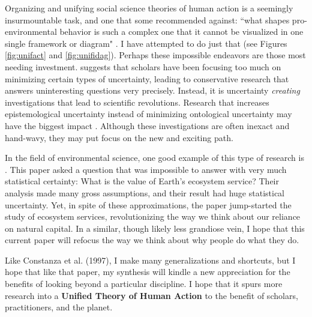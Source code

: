 \documentclass[12 pt]{article}
\begin{document}
 
Organizing and unifying social science theories of human action is a seemingly insurmountable task, and one that some recommended against: ``what shapes pro-environmental behavior is such a complex one that it cannot be visualized in one single framework or diagram" \parencite[][p. 248]{Kollmuss2002}. I have attempted to do just that (see Figures \ref{fig:unifact} and \ref{fig:unifidag}). 
Perhaps these impossible endeavors are those most needing investment. \textcite{Haslam2001} suggests that scholars have been focusing too much on minimizing certain types of uncertainty, leading to conservative research that answers uninteresting questions very precisely. Instead, it is uncertainty \textit{creating} investigations that lead to scientific revolutions. Research that increases epistemological uncertainty instead of minimizing ontological uncertainty may have the biggest impact \parencite{Haslam2001}. Although these investigations are often inexact and hand-wavy, they may put focus on the new and exciting path. 

In the field of environmental science, one good example of this type of research is \textcite{Costanza1997}. This paper asked a question that was impossible to answer with very much statistical certainty: What is the value of Earth's ecosystem service? Their analysis made many gross assumptions, and their result had huge statistical uncertainty. Yet, in spite of these approximations, the paper jump-started the study of ecosystem services, revolutionizing the way we think about our reliance on natural capital.  In a similar, though likely less grandiose vein, I hope that this current paper will refocus the way we think about why people do what they do. 

Like Constanza et al. (1997), I make many generalizations and shortcuts, but I hope that like that paper, my synthesis will kindle a new appreciation for the benefits of looking beyond a particular discipline. I hope that it spurs more research into a \textbf{Unified Theory of Human Action} to the benefit of scholars, practitioners, and the planet. 
\bigskip
\bigskip
\bigskip

\printbibliography
\end{document}
